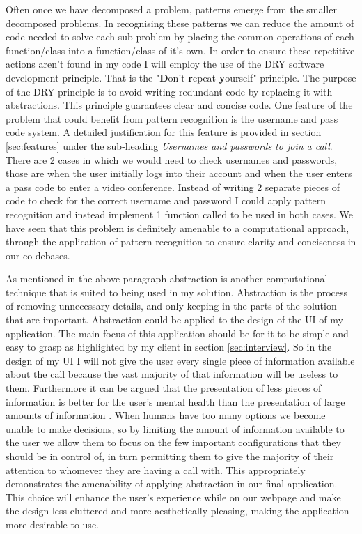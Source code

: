 Often once we have decomposed a problem, patterns emerge from 
the smaller decomposed problems. In recognising these patterns
we can reduce the amount of code needed to solve each 
sub-problem by placing the common operations of each 
function/class into a function/class of it's own. In order to 
ensure these repetitive actions aren't found in my code I will
employ the use of the DRY software development principle. 
That is the "\textbf{D}on't \textbf{r}epeat \textbf{y}ourself"
principle. The purpose of the DRY principle is to avoid 
writing redundant code by replacing it with abstractions. This
principle guarantees clear and concise code. One feature of 
the problem that could benefit from pattern recognition is the 
username and pass code system. A detailed justification for this
feature is provided in section \ref{sec:features} under the
sub-heading \textit{Usernames and passwords to join a call}.
There are 2 cases in which we would need to check usernames
and passwords, those are when the user initially logs into 
their account and when the user enters a pass code to enter a
video conference. Instead of writing 2 separate pieces of
code to check for the correct username and password I could
apply pattern recognition and instead implement 1 function 
called  to be used in both 
cases. We have seen that this problem is definitely amenable 
to a computational approach, through the application of
pattern recognition to ensure clarity and conciseness in our 
co debases. \vspace{0.2cm}

As mentioned in the above paragraph abstraction is another 
computational technique that is suited to being used in my 
solution. Abstraction is the process of removing unnecessary
details, and only keeping in the parts of the solution that are
important. Abstraction could be applied to the design of the 
UI of my application. The main focus of this application should
be for it to be simple and easy to grasp as highlighted by my 
client in section \ref{sec:interview}. So in the design of my
UI I will not give the user every single piece of information
available about the call because the vast majority of that 
information will be useless to them. Furthermore it can be 
argued that the presentation of less pieces of information is
better for the user's mental health than the presentation of
large amounts of information \cite{overchoice}. When humans 
have too many options we become unable to make decisions, so
by limiting the amount of information available to the user we
allow them to focus on the few important configurations that
they should be 
in control of, in turn permitting them to give the majority of
their attention to whomever they are having a call with. This 
appropriately demonstrates the amenability of applying
abstraction in our final application. This choice will enhance
the user's experience while on our webpage and make the design
less cluttered and more aesthetically pleasing, making the 
application more desirable to use.  \\ \vspace{0.2cm}

